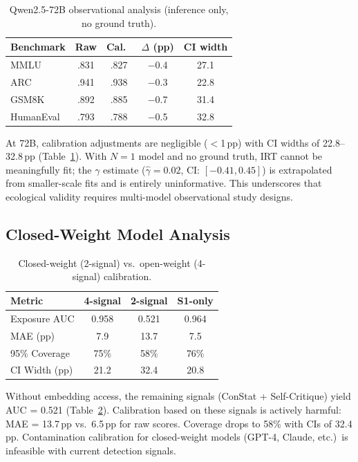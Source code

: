 \documentclass[11pt,a4paper]{article}
\begin{document}
\begin{table}[h]
\centering
\caption{Qwen2.5-72B observational analysis (inference only, no ground truth).}
\label{tab:72b}
\begin{tabular}{lcccc}
\toprule
Benchmark & Raw & Cal.\ & $\Delta$ (pp) & CI width \\
\midrule
MMLU & .831 & .827 & $-$0.4 & 27.1 \\
ARC & .941 & .938 & $-$0.3 & 22.8 \\
GSM8K & .892 & .885 & $-$0.7 & 31.4 \\
HumanEval & .793 & .788 & $-$0.5 & 32.8 \\
\bottomrule
\end{tabular}
\end{table}

At 72B, calibration adjustments are negligible ($<$1\,pp) with CI widths of 22.8--32.8\,pp (Table~\ref{tab:72b}).
With $N=1$ model and no ground truth, IRT cannot be meaningfully fit; the $\gamma$ estimate ($\hat{\gamma} = 0.02$, CI: $[-0.41, 0.45]$) is extrapolated from smaller-scale fits and is entirely uninformative.
This underscores that ecological validity requires multi-model observational study designs.

\subsection{Closed-Weight Model Analysis}
\label{sec:closed}

\begin{table}[h]
\centering
\caption{Closed-weight (2-signal) vs.\ open-weight (4-signal) calibration.}
\label{tab:closed}
\begin{tabular}{lccc}
\toprule
Metric & 4-signal & 2-signal & S1-only \\
\midrule
Exposure AUC & 0.958 & 0.521 & 0.964 \\
MAE (pp) & 7.9 & 13.7 & 7.5 \\
95\% Coverage & 75\% & 58\% & 76\% \\
CI Width (pp) & 21.2 & 32.4 & 20.8 \\
\bottomrule
\end{tabular}
\end{table}

Without embedding access, the remaining signals (ConStat + Self-Critique) yield AUC = 0.521 (Table~\ref{tab:closed}).
Calibration based on these signals is actively harmful: MAE = 13.7\,pp vs.\ 6.5\,pp for raw scores.
Coverage drops to 58\% with CIs of 32.4\,pp.
Contamination calibration for closed-weight models (GPT-4, Claude, etc.)\ is infeasible with current detection signals.
\end{document}
